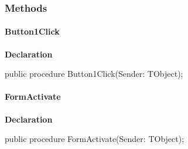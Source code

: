 \documentclass{report}
\newif\ifpdf
\begin{document}
\subsubsection*{\large{\textbf{Methods}}\normalsize\hspace{1ex}\hfill}
\paragraph*{Button1Click}\hspace*{\fill}

\label{updexec.TUExecFm-Button1Click}
\begin{list}{}{
\setlength{\itemindent}{0cm}
\setlength{\listparindent}{0cm}
\setlength{\leftmargin}{\evensidemargin}
\addtolength{\leftmargin}{\tmplength}
\settowidth{\labelsep}{X}
\addtolength{\leftmargin}{\labelsep}
\setlength{\labelwidth}{\tmplength}
}
\item[\textbf{Declaration}\hfill]
\ifpdf
\begin{flushleft}
\fi
\begin{ttfamily}
public procedure Button1Click(Sender: TObject);\end{ttfamily}

\ifpdf
\end{flushleft}
\fi

\end{list}
\paragraph*{FormActivate}\hspace*{\fill}

\label{updexec.TUExecFm-FormActivate}
\begin{list}{}{
\setlength{\itemindent}{0cm}
\setlength{\listparindent}{0cm}
\setlength{\leftmargin}{\evensidemargin}
\addtolength{\leftmargin}{\tmplength}
\settowidth{\labelsep}{X}
\addtolength{\leftmargin}{\labelsep}
\setlength{\labelwidth}{\tmplength}
}
\item[\textbf{Declaration}\hfill]
\ifpdf
\begin{flushleft}
\fi
\begin{ttfamily}
public procedure FormActivate(Sender: TObject);\end{ttfamily}

\ifpdf
\end{flushleft}
\fi

\end{list}
\end{document}
